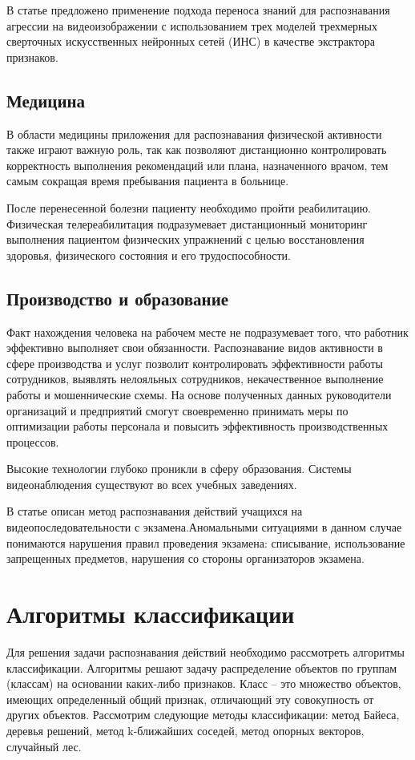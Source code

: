 В статье \cite{safe} предложено применение подхода переноса знаний для распознавания агрессии на видеоизображении с использованием трех моделей трехмерных сверточных искусственных нейронных сетей (ИНС) в качестве экстрактора признаков.

\subsection{Медицина}

В области медицины приложения для распознавания физической активности также
играют важную роль, так как позволяют дистанционно контролировать корректность выполнения рекомендаций или плана, назначенного врачом, тем самым сокращая время пребывания пациента в больнице.

После перенесенной болезни пациенту необходимо пройти реабилитацию. Физическая телереабилитация подразумевает дистанционный мониторинг выполнения пациентом физических упражнений с целью восстановления здоровья, физического состояния и его трудоспособности.


\subsection{Производство и образование}

Факт нахождения человека на рабочем месте не подразумевает того, что работник
эффективно выполняет свои обязанности. Распознавание видов активности в сфере производства и услуг позволит контролировать эффективности работы сотрудников, выявлять нелояльных сотрудников, некачественное выполнение работы и мошеннические
схемы. На основе полученных данных руководители организаций и предприятий смогут своевременно принимать меры по оптимизации работы персонала и повысить эффективность производственных процессов.

Высокие технологии глубоко проникли в сферу образования. Системы видеонаблюдения существуют во всех учебных заведениях.

В статье \cite{ex} описан метод распознавания действий учащихся на видеопоследовательности с экзамена.\newline Аномальными ситуациями в данном
случае понимаются нарушения правил проведения экзамена: списывание, использование запрещенных предметов, нарушения со стороны организаторов экзамена.

\section{Алгоритмы классификации}
Для решения задачи распознавания действий необходимо рассмотреть алгоритмы классификации. Алгоритмы решают задачу  распределение объектов по группам (классам) на основании каких-либо признаков. Класс -- это множество объектов, имеющих определенный общий признак, отличающий эту совокупность от других объектов. Рассмотрим следующие
методы классификации: метод Байеса, деревья решений, метод k-ближайших соседей, метод опорных
векторов, случайный лес.

